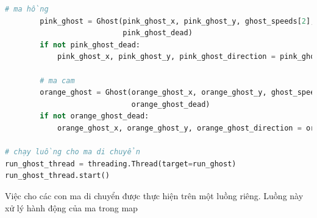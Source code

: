 \documentclass[a4paper]{article}
\begin{document}
\begin{lstlisting}[language=Python]
        # ma hồng
        pink_ghost = Ghost(pink_ghost_x, pink_ghost_y, ghost_speeds[2], pink_ghost_direction,
                           pink_ghost_dead)
        if not pink_ghost_dead:
            pink_ghost_x, pink_ghost_y, pink_ghost_direction = pink_ghost.move()

        # ma cam
        orange_ghost = Ghost(orange_ghost_x, orange_ghost_y, ghost_speeds[3], orange_ghost_direction,
                             orange_ghost_dead)
        if not orange_ghost_dead:
            orange_ghost_x, orange_ghost_y, orange_ghost_direction = orange_ghost.move()
            
# chạy luồng cho ma di chuyển
run_ghost_thread = threading.Thread(target=run_ghost)
run_ghost_thread.start()
\end{lstlisting}
Việc cho các con ma di chuyển được thực hiện trên một luồng riêng. Luồng này xử lý hành động của ma trong map
\end{document}
